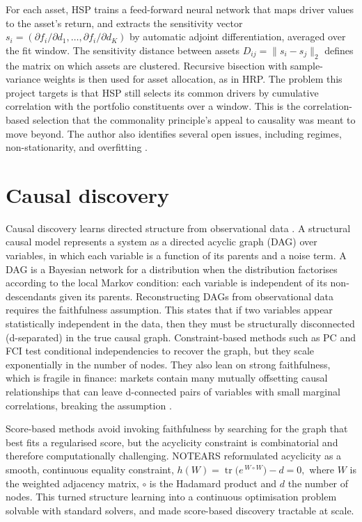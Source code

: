 \documentclass[12pt, a4paper]{report}
\begin{document}
For each asset, HSP trains a feed-forward neural network that maps driver values to the
asset's return, and extracts the sensitivity vector
\(
  s_i = \left( \partial f_i / \partial d_1, \ldots, \partial f_i / \partial d_K \right)
\)
by automatic adjoint differentiation, averaged over the fit window. The sensitivity
distance between assets
\(
  D_{ij} = \lVert s_i - s_j \rVert_2
\)
defines the matrix on which assets are clustered. 
Recursive bisection with sample-variance weights is then used for asset allocation, as in HRP. 
The problem this project targets is that HSP
still selects its common drivers by cumulative correlation with the portfolio
constituents over a window. 
This is the correlation-based selection that the commonality
principle's appeal to causality was meant to move beyond. The author also identifies several open issues, including regimes,
non-stationarity, and overfitting \cite{rodriguez2023hsp}.

\section{Causal discovery}
\label{sec:cd-foundations}

Causal discovery learns directed structure from observational data \cite{spirtes2000causation,kaddour2022causalml}. A structural causal model represents a system as a
directed acyclic graph (DAG) over variables, in which each variable is a function of its parents
and a noise term. A DAG is a Bayesian network for a distribution when the distribution factorises
according to the local Markov condition: each variable is independent of its non-descendants given
its parents. 
Reconstructing DAGs from observational data requires the faithfulness assumption.
This states that if two variables appear statistically independent in the data, then they must be structurally disconnected (d-separated) in the true causal graph.
Constraint-based methods such as PC and FCI \cite{spirtes2000causation} test conditional
independencies to recover the graph, but they scale exponentially in the number of nodes.
They also lean on strong faithfulness, which is fragile in finance: markets
contain many mutually offsetting causal relationships that can leave d-connected pairs of variables with small
marginal correlations, breaking the assumption \cite{howard2025causal}.

Score-based methods avoid invoking faithfulness by searching for the graph that best fits a regularised
score, but the acyclicity constraint is combinatorial and therefore computationally challenging. 
NOTEARS \cite{zheng2018notears} reformulated acyclicity as a smooth, continuous equality constraint,
\(
  h(W) = \operatorname{tr}\!\big(e^{\,W \circ W}\big) - d = 0,
\)
where $W$ is the weighted adjacency matrix, $\circ$ is the Hadamard product and $d$ the number of
nodes. This turned structure learning into a continuous optimisation problem solvable with standard
solvers, and made score-based discovery tractable at scale. 
\end{document}
